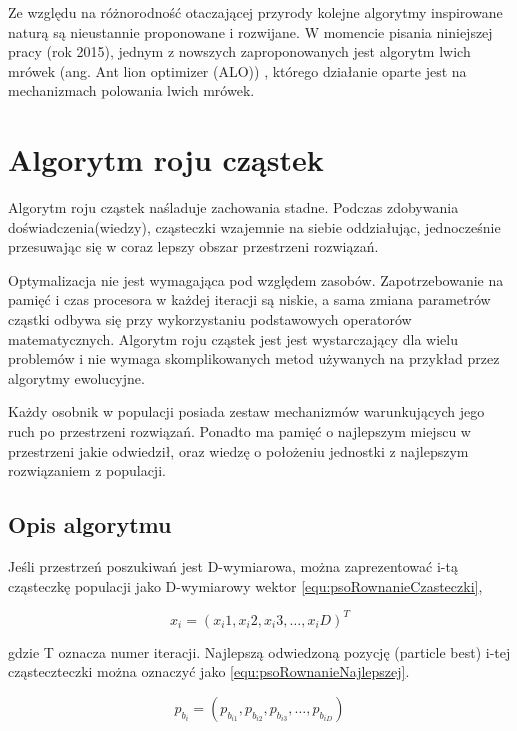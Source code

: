 Ze względu na różnorodność otaczającej przyrody kolejne algorytmy inspirowane naturą są nieustannie proponowane i rozwijane. W momencie pisania niniejszej pracy (rok 2015), jednym z nowszych zaproponowanych jest algorytm lwich mrówek (ang. Ant lion optimizer (ALO)) \cite{ALO}, którego działanie oparte jest na mechanizmach polowania lwich mrówek.

\section{Algorytm roju cząstek}
\label{sec:psoOpis}
Algorytm roju cząstek naśladuje zachowania stadne. Podczas zdobywania doświadczenia(wiedzy), cząsteczki wzajemnie na siebie oddziałując, jednocześnie przesuwając się w coraz lepszy obszar przestrzeni rozwiązań. 

Optymalizacja nie jest wymagająca pod względem zasobów. Zapotrzebowanie na pamięć i czas procesora w każdej iteracji są niskie, a sama zmiana parametrów cząstki odbywa się przy wykorzystaniu podstawowych operatorów matematycznych. Algorytm roju cząstek jest jest wystarczający dla wielu problemów i nie wymaga skomplikowanych metod używanych na przykład przez algorytmy ewolucyjne.

Każdy osobnik w populacji posiada zestaw mechanizmów warunkujących jego ruch po przestrzeni rozwiązań. Ponadto ma pamięć o najlepszym miejscu w przestrzeni jakie odwiedził, oraz wiedzę o położeniu jednostki z najlepszym rozwiązaniem z populacji.

\subsection{Opis algorytmu}
\label{sec:psoRownania}
Jeśli przestrzeń poszukiwań jest D-wymiarowa, można zaprezentować i-tą cząsteczkę populacji jako D-wymiarowy wektor \ref{equ:psoRownanieCzasteczki},

\begin{equation}
\label{equ:psoRownanieCzasteczki}
x_i = (x_i1, x_i2, x_i3, \dots, x_iD)^T
\end{equation}

gdzie T oznacza numer iteracji. Najlepszą odwiedzoną pozycję (particle best) i-tej cząsteczteczki można oznaczyć jako \ref{equ:psoRownanieNajlepszej}.

\begin{equation}
\label{equ:psoRownanieNajlepszej}
p_{b_i} = (p_{b_{i1}}, p_{b_{i2}}, p_{b_{i3}}, \dots, p_{b_{iD}})
\end{equation}

